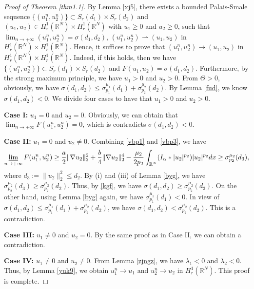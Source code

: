 \documentclass[reqno]{amsart}
\begin{document}
\begin{proof}[Proof of Theorem \ref{thm1.1}] 
By Lemma \ref{xj5}, there exists a bounded Palais-Smale sequence 
$\{(u_1^n,u_2^n)\}\subset S_{r}(d_1)\times S_{r}(d_2)$
and $(u_1,u_2)\in H_r^1(\mathbb{R}^N)\times H_r^1(\mathbb{R}^N)$ with $u_1\geq0$ 
and $u_2\geq0$, such that $\lim_{n\to +\infty}
(u_1^n,u_2^n)=\sigma(d_1,d_2)$, $(u_1^n,u_2^n)\rightharpoonup(u_1,u_2)$ in 
$H_r^1(\mathbb{R}^N)\times H_r^1(\mathbb{R}^N)$. Hence, it suffices to
prove that $(u_1^n,u_2^n)\to (u_1,u_2)$ in 
$H_r^1(\mathbb{R}^N)\times H_r^1(\mathbb{R}^N)$. Indeed, if this holds, then we have
$\{(u_1^n,u_2^n)\}\subset S_{r}(d_1)\times S_{r}(d_2)$ and 
$F(u_1,u_2)=\sigma(d_1,d_2)$. Furthermore, by the strong maximum principle,
we have $u_1>0$ and $u_2>0$. From $\Theta>0$, obviously, we have 
$\sigma(d_1,d_2)\leq\sigma_{p_1}^{\mu_1}(d_1)+\sigma_{p_2}^{\mu_2}(d_2)$. 
By Lemma \ref{fud}, we know
$\sigma(d_1,d_2)<0$. We divide four cases to have that $u_1>0$ and $u_2>0$.
\smallskip 

\noindent\textbf{Case I:} $u_1=0$ and $u_2=0$.
Obviously, we can obtain that $\lim_{n\to +\infty}F(u_1^n,u_2^n)=0$, which is 
 contradicts $\sigma(d_1,d_2)<0$.
\smallskip

\noindent\textbf{Case II:} $u_1=0$ and $u_2\neq0$.
Combining \eqref{vbp1} and \eqref{vbp3}, we have
\begin{equation}\label{kgf}
\varliminf_{n\to +\infty}F(u_1^n,u_2^n)
\geq\frac{a}{2}\| \nabla u_2\|_2^2+\frac{b}{4}\|
 \nabla u_2\|_2^4-\frac{\mu_2}{2p_2}
 \int_{\mathbb{R}^N}(I_\alpha\ast|u_2|^{p_2})|u_2|^{p_2}dx
\geq \sigma_{p_2}^{\mu_2}(d_3),
\end{equation}
where $d_3:=\| u_2\|_2^2\leq d_2$. By (i) and (iii) of Lemma \ref{byg}, 
we have $\sigma_{p_2}^{\mu_2}(d_3)\geq\sigma_{p_2}^{\mu_2}(d_2)$.
Thus, by \eqref{kgf}, we have $\sigma(d_1,d_2)\geq \sigma_{p_2}^{\mu_2}(d_3)$. 
On the other hand, using Lemma \ref{byg} again, we have $\sigma_{p_1}^{\mu_1}(d_1)<0$. 
In view of $\sigma(d_1,d_2)\leq\sigma_{p_1}^{\mu_1}(d_1)+\sigma_{p_2}^{\mu_2}(d_2)$, 
we have $\sigma(d_1,d_2)<\sigma_{p_2}^{\mu_2}(d_2)$.
This is a contradiction.
\smallskip

\noindent\textbf{Case III:} $u_1\neq0$ and $u_2=0$.
By the same proof as in Case II, we can  obtain a contradiction.
\smallskip

\noindent\textbf{Case IV:} $u_1\neq0$ and $u_2\neq0$.
From Lemma \ref{zjngz}, we have $\lambda_1<0$ and $\lambda_2<0$. Thus, by 
Lemma \ref{yuk9}, we obtain $u_1^n\to  u_1$ and
$u_2^n\to  u_2$ in $H_r^1(\mathbb{R}^N)$. This proof is complete.
\end{proof}
\end{document}
